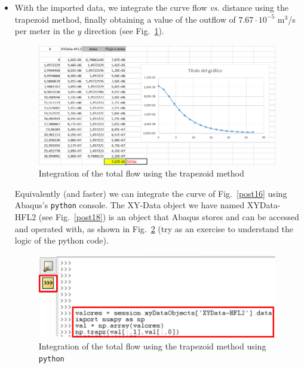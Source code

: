 \begin{itemize}
\item With the imported data, we integrate the curve flow \textit{vs.}
  distance using the trapezoid method, finally obtaining a value of
  the outflow of $7.67\cdot 10^{-5}$ m$^3$/s per meter in the $y$
  direction (see Fig.~\ref{post26}).
  \begin{figure}[!h]
    \begin{center}
      \includegraphics[width=0.99\textwidth]{./body/images/post26}
    \end{center}
    \caption{Integration of the total flow using the trapezoid method}
    \label{post26}
  \end{figure}

  Equivalently (and faster) we can integrate the curve of
  Fig.~\ref{post16} using Abaqus's \texttt{python} console. The
  XY-Data object we have named XYData-HFL2 (see Fig.~\ref{post18}) is
  an object that Abaqus stores and can be accessed and operated with,
  as shown in Fig.~\ref{post26b} (try as an exercise to understand the
  logic of the python code).
  \begin{figure}[!h]
    \begin{center}
      \includegraphics[width=0.99\textwidth]{./body/images/post26b.pdf}
    \end{center}
    \caption{Integration of the total flow using the trapezoid method
      using \texttt{python}}
    \label{post26b}
  \end{figure}


\end{itemize}
